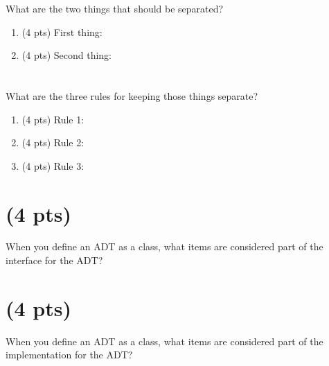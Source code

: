 \documentclass[11pt]{article}
\begin{document}
What are the two things that should be separated?

\begin{enumerate}
\item (4 pts) First thing:
\item (4 pts) Second thing:
\end{enumerate}

\section{}
\label{sec:org98e459a}
What are the three rules for keeping those things separate?

\begin{enumerate}
\item (4 pts) Rule 1:
\item (4 pts) Rule 2:
\item (4 pts) Rule 3:
\end{enumerate}

\section{(4 pts)}
\label{sec:orgec4222c}

When you define an ADT as a class, what items are considered part of
the interface for the ADT?
\vspace{4em}

\section{(4 pts)}
\label{sec:orgb376198}

When you define an ADT as a class, what items are considered part of
the implementation for the ADT?
\vspace{4em}
\end{document}
